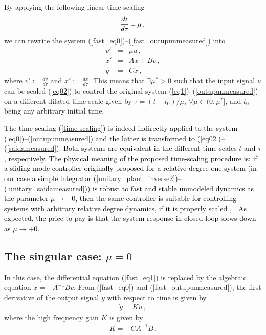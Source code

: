 \documentclass[review]{elsarticle}
\begin{document}
By applying the following linear time-scaling \cite{MONPP:2002}
%
\begin{equation}
  \frac{d t}{d \tau} = \mu\,,                                              \label{time-scaling}\\
\end{equation}
%
we can rewrite the system (\ref{fast_eq0})--(\ref{fast_outupunmeasured}) into
%
\begin{eqnarray}
  v' &=& \mu u\,,           \label{eq02}\\
  x' &=& A x + Bv\,,     \label{plant_inverse2}\\
  y&=& Cx\,,         \label{saidameasured}
  \end{eqnarray}
%
where $v':=\frac{d v}{d \tau}$ and $x':=\frac{d x}{d \tau}$. This means that $\exists \mu^*>0$ such that the input signal $u$
can be scaled (\ref{eq02}) to control the original system (\ref{eq1})--(\ref{outupunmeasured}) on a different dilated time scale given by %
%
$\tau=(t-t_0)/\mu$,  $\forall \mu \in (0,\mu^*]$, and $t_0$ being any arbitrary initial time.


\textcolor{black}{The time-scaling (\ref{time-scaling}) is indeed indirectly applied to the system (\ref{eq0})--(\ref{outupunmeasured}) and the latter is transformed to (\ref{eq02})--(\ref{saidameasured}). Both systems are equivalent in the different time scales $t$ and $\tau$, respectively.} 
%
\textcolor{black}{The physical meaning of the proposed time-scaling procedure is: if a sliding mode controller originally proposed for a relative degree one system (in our case a simple integrator (\ref{unitary_plant_inverse2})--(\ref{unitary_saidameasured})) is robust to fast and stable unmodeled dynamics as the parameter $\mu\to+0$, then the same controller is suitable for controlling systems with arbitrary relative degree dynamics, if it is properly scaled \cite{HOC:2014}, \cite{OAH:2014}. As expected, the price to pay is that the system response in closed loop slows down as $\mu\to +0$.}



\subsection{The singular case: $\mu=0$}

In this case, the differential equation (\ref{fast_eq1}) is replaced by the algebraic equation $x=-A^{-1}Bv$. From
(\ref{fast_eq0}) and (\ref{fast_outupunmeasured}), the first derivative of the output signal $y$ with respect to time is given by
%
\begin{align}
\dot{y} = K u\,,\label{eq:ydynamics}
\end{align}
%
where the high frequency gain $K$ is given by
%
\begin{align}
K=-CA^{-1}B\,. \label{kpneras}
\end{align}
\end{document}
